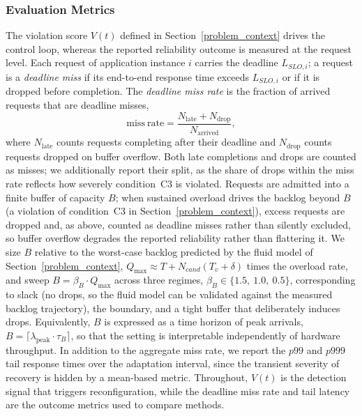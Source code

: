 \documentclass[conference]{IEEEtran}
\begin{document}
\textcolor{navyblue}{\subsubsection{Evaluation Metrics}
\label{subsec:metrics}
The violation score $V(t)$ defined in Section~\ref{problem_context} drives the control loop, whereas the reported reliability outcome is measured at the request level. Each request of application instance $i$ carries the deadline $L_{SLO,i}$; a request is a \emph{deadline miss} if its end-to-end response time exceeds $L_{SLO,i}$ or if it is dropped before completion. The \emph{deadline miss rate} is the fraction of arrived requests that are deadline misses,
\begin{equation}
\mathrm{miss\ rate} = \frac{N_{\mathrm{late}} + N_{\mathrm{drop}}}{N_{\mathrm{arrived}}},
\end{equation}
where $N_{\mathrm{late}}$ counts requests completing after their deadline and $N_{\mathrm{drop}}$ counts requests dropped on buffer overflow. \textcolor{navyblue}{Both late completions and drops are counted as misses; we additionally report their split, as the share of drops within the miss rate reflects how severely condition~C3 is violated.} Requests are admitted into a finite buffer of capacity $B$; when sustained overload drives the backlog beyond $B$ (a violation of condition~C3 in Section~\ref{problem_context}), excess requests are dropped and, as above, counted as deadline misses rather than silently excluded, so buffer overflow degrades the reported reliability rather than flattering it. \textcolor{navyblue}{We size $B$ relative to the worst-case backlog predicted by the fluid model of Section~\ref{problem_context}, $Q_{\max} \approx T + N_{cand}(T_v+\delta)$ times the overload rate, and sweep $B = \beta_B \cdot Q_{\max}$ across three regimes, $\beta_B \in \{1.5,\ 1.0,\ 0.5\}$, corresponding to slack (no drops, so the fluid model can be validated against the measured backlog trajectory), the boundary, and a tight buffer that deliberately induces drops. Equivalently, $B$ is expressed as a time horizon of peak arrivals, $B = \lceil \lambda_{\mathrm{peak}} \cdot \tau_B \rceil$, so that the setting is interpretable independently of hardware throughput.} In addition to the aggregate miss rate, we report the $p99$ and $p999$ tail response times over the adaptation interval, since the transient severity of recovery is hidden by a mean-based metric. Throughout, $V(t)$ is the detection signal that triggers reconfiguration, while the deadline miss rate and tail latency are the outcome metrics used to compare methods.}
\end{document}
